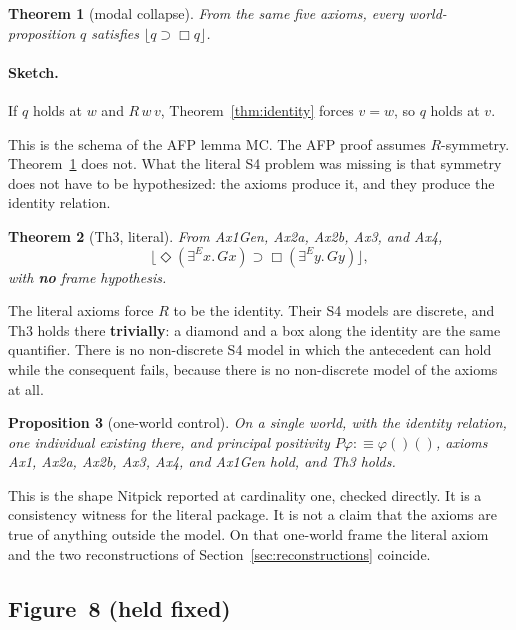 \documentclass[11pt]{article}
\newtheorem{theorem}{Theorem}
\newtheorem{proposition}[theorem]{Proposition}
\newcommand{\floor}[1]{\lfloor #1 \rfloor}
\begin{document}
\begin{theorem}[modal collapse]
\label{thm:collapse}
From the same five axioms, every world-proposition \(q\) satisfies \(\floor{q \supset \Box q}\).
\end{theorem}

\paragraph{Sketch.}
If \(q\) holds at \(w\) and \(R\,w\,v\), Theorem~\ref{thm:identity} forces \(v = w\), so
\(q\) holds at \(v\).

This is the schema of the AFP lemma MC. The AFP proof assumes \(R\)-symmetry.
Theorem~\ref{thm:collapse} does not. What the literal S4 problem was missing is that
symmetry does not have to be hypothesized: the axioms produce it, and they produce the
identity relation.

\begin{theorem}[Th3, literal]
\label{thm:th3}
From Ax1Gen, Ax2a, Ax2b, Ax3, and Ax4,
\[
\floor{\Diamond(\exists^E x.\, Gx) \supset \Box(\exists^E y.\, Gy)},
\]
with \textbf{no} frame hypothesis.
\end{theorem}

The literal axioms force \(R\) to be the identity. Their S4 models are discrete, and Th3
holds there \textbf{trivially}: a diamond and a box along the identity are the same
quantifier. There is no non-discrete S4 model in which the antecedent can hold while the
consequent fails, because there is no non-discrete model of the axioms at all.

\begin{proposition}[one-world control]
On a single world, with the identity relation, one individual existing there, and principal
positivity \(P\varphi :\equiv \varphi()()\), axioms Ax1, Ax2a, Ax2b, Ax3, Ax4, and Ax1Gen
hold, and Th3 holds.
\end{proposition}

This is the shape Nitpick reported at cardinality one, checked directly. It is a
consistency witness for the literal package. It is not a claim that the axioms are true of
anything outside the model. On that one-world frame the literal axiom and the two
reconstructions of Section~\ref{sec:reconstructions} coincide.

\subsection{Figure~8 (held fixed)}
\end{document}
